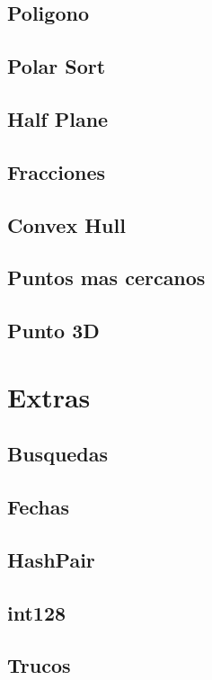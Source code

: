 \subsection{Poligono}
\raggedbottom
\hrulefill
\subsection{Polar Sort}
\raggedbottom
\hrulefill
\subsection{Half Plane}
\raggedbottom
\hrulefill
\subsection{Fracciones}
\raggedbottom
\hrulefill
\subsection{Convex Hull}
\raggedbottom
\hrulefill
\subsection{Puntos mas cercanos}
\raggedbottom
\hrulefill
\subsection{Punto 3D}
\raggedbottom
\hrulefill
\newpage

\section{Extras}
\subsection{Busquedas}
\raggedbottom
\hrulefill
\subsection{Fechas}
\raggedbottom
\hrulefill
\subsection{HashPair}
\raggedbottom
\hrulefill
\subsection{int128}
\raggedbottom
\hrulefill
\subsection{Trucos}
\raggedbottom
\hrulefill
\newpage

